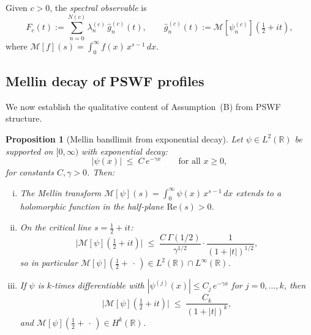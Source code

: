 \documentclass[12pt,a4paper]{amsart}
\newtheorem{proposition}[theorem]{Proposition}
\theoremstyle{definition}
\begin{document}
Given $c > 0$, the \emph{spectral observable} is
\[
F_c(t)
:= \sum_{n=0}^{N(c)}
\lambda_n^{(c)}\,\widehat{g}_n^{(c)}(t),
\qquad
\widehat{g}_n^{(c)}(t)
:= \mathcal{M}[\psi_n^{(c)}]\!
\left(\tfrac{1}{2}+it\right),
\]
where $\mathcal{M}[f](s)
= \int_0^\infty f(x)\,x^{s-1}\,dx$.

\subsection{Mellin decay of PSWF profiles}

We now establish the qualitative content of
Assumption~(B) from PSWF structure.

\begin{proposition}[Mellin bandlimit from exponential
decay]
\label{prop:mellin-decay}
Let $\psi \in L^2(\mathbb{R})$ be supported on
$[0, \infty)$ with exponential decay:
\begin{equation}
\label{eq:exp-decay}
|\psi(x)| \;\le\; C\,e^{-\gamma x}
\qquad \text{for all } x \ge 0,
\end{equation}
for constants $C, \gamma > 0$. Then:
\begin{enumerate}[(i)]
\item The Mellin transform
$\mathcal{M}[\psi](s)
= \int_0^\infty \psi(x)\,x^{s-1}\,dx$
extends to a holomorphic function in the half-plane
$\mathrm{Re}(s) > 0$.
\item On the critical line
$s = \tfrac{1}{2} + it$:
\begin{equation}
\label{eq:mellin-decay-bound}
\bigl|\mathcal{M}[\psi]\!
\left(\tfrac{1}{2}+it\right)\bigr|
\;\le\;
\frac{C\,\Gamma(1/2)}{\gamma^{1/2}}
\cdot \frac{1}{(1 + |t|)^{1/2}},
\end{equation}
so in particular
$\mathcal{M}[\psi](\tfrac{1}{2}+\,\cdot\,)
\in L^2(\mathbb{R}) \cap L^\infty(\mathbb{R})$.
\item If $\psi$ is $k$-times differentiable with
$|\psi^{(j)}(x)| \le C_j\,e^{-\gamma x}$ for
$j = 0,\ldots,k$, then
\begin{equation}
\label{eq:mellin-smooth-decay}
\bigl|\mathcal{M}[\psi]\!
\left(\tfrac{1}{2}+it\right)\bigr|
\;\le\; \frac{C_k}{(1+|t|)^k},
\end{equation}
and $\mathcal{M}[\psi](\tfrac{1}{2}+\,\cdot\,)
\in H^k(\mathbb{R})$.
\end{enumerate}
\end{proposition}
\end{document}

